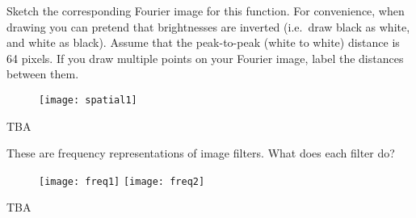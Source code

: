 \begin{blocksection}
\question Sketch the corresponding Fourier image for this function. For convenience, when drawing you can pretend that brightnesses are inverted (i.e.~draw black as white, and white as black). Assume that the peak-to-peak (white to white) distance is 64 pixels. If you draw multiple points on your Fourier image, label the distances between them.

\begin{figure}[H]
\centering
\texttt{[image: spatial1]}
\end{figure}

\vspace*{20mm}

\begin{solution}[0.75in]
{\color{red} TBA}
\end{solution}
\end{blocksection}


\begin{blocksection}
\question These are frequency representations of image filters. What does each filter do?

\begin{figure}[H]
\centering
\texttt{[image: freq1]} \hspace*{4mm} \texttt{[image: freq2]}
\end{figure}

\begin{solution}[0.75in]
{\color{red} TBA}
\end{solution}
\end{blocksection}

